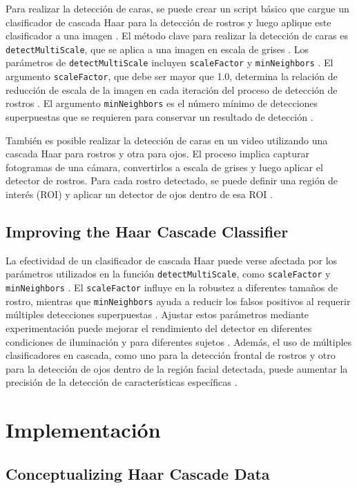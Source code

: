 \documentclass[a4paper]{article}
\begin{document}
Para realizar la detección de caras, se puede crear un script básico que cargue un clasificador de cascada Haar para la detección de rostros y luego aplique este clasificador a una imagen . El método clave para realizar la detección de caras es \texttt{detectMultiScale}, que se aplica a una imagen en escala de grises . Los parámetros de \texttt{detectMultiScale} incluyen \texttt{scaleFactor} y \texttt{minNeighbors} . El argumento \texttt{scaleFactor}, que debe ser mayor que 1.0, determina la relación de reducción de escala de la imagen en cada iteración del proceso de detección de rostros . El argumento \texttt{minNeighbors} es el número mínimo de detecciones superpuestas que se requieren para conservar un resultado de detección .

También es posible realizar la detección de caras en un video utilizando una cascada Haar para rostros y otra para ojos. El proceso implica capturar fotogramas de una cámara, convertirlos a escala de grises y luego aplicar el detector de rostros. Para cada rostro detectado, se puede definir una región de interés (ROI) y aplicar un detector de ojos dentro de esa ROI .

\subsection{Improving the Haar Cascade Classifier}

La efectividad de un clasificador de cascada Haar puede verse afectada por los parámetros utilizados en la función \texttt{detectMultiScale}, como \texttt{scaleFactor} y \texttt{minNeighbors} . El \texttt{scaleFactor} influye en la robustez a diferentes tamaños de rostro, mientras que \texttt{minNeighbors} ayuda a reducir los falsos positivos al requerir múltiples detecciones superpuestas . Ajustar estos parámetros mediante experimentación puede mejorar el rendimiento del detector en diferentes condiciones de iluminación y para diferentes sujetos . Además, el uso de múltiples clasificadores en cascada, como uno para la detección frontal de rostros y otro para la detección de ojos dentro de la región facial detectada, puede aumentar la precisión de la detección de características específicas .

\section{Implementación}

\subsection{Conceptualizing Haar Cascade Data}
\end{document}
